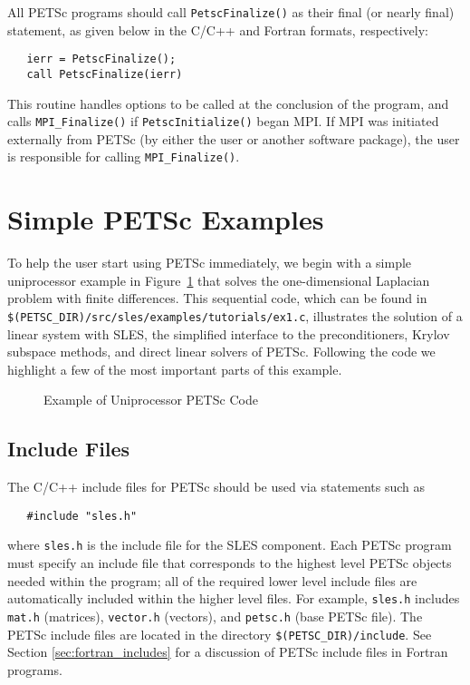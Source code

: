 {All PETSc programs should call {\tt PetscFinalize()} 
as their final (or nearly final) statement, as given below in the C/C++
and Fortran formats, respectively:
\begin{verbatim}
   ierr = PetscFinalize();
   call PetscFinalize(ierr)
\end{verbatim}
This routine handles options to be called at the conclusion of
the program, and calls {\tt MPI\_Finalize()} 
if {\tt PetscInitialize()}
began MPI. If MPI was initiated externally from PETSc (by either
the user or another software package), the user is
responsible for calling {\tt MPI\_Finalize()}. 

\section{Simple PETSc Examples}

\label{sec:simple}

To help the user start using PETSc immediately, we begin with a simple
uniprocessor example in Figure~\ref{fig:example1} that solves the
one-dimensional Laplacian problem with finite differences.  This
sequential code, which can be found in 
{\tt \$(PETSC\_DIR)/src/sles/examples/tutorials/ex1.c},
illustrates the solution of a linear system with SLES, the simplified
interface to the preconditioners, Krylov subspace methods, and direct
linear solvers of PETSc.  Following the code we highlight a few of the most important
parts of this example.  

\begin{figure}[H]
{\footnotesize
{}
}
\caption{Example of Uniprocessor PETSc Code}
\label{fig:example1}
\end{figure}

\subsection*{Include Files}

The C/C++ include files for PETSc should be used via statements such as
\begin{verbatim}
   #include "sles.h"
\end{verbatim}
where {\tt sles.h} is the include file for the SLES component.
Each PETSc program must specify an
include file that corresponds to the highest level PETSc objects
needed within the program; all of the required lower level include
files are automatically included within the higher level files.  For
example, {\tt sles.h} includes {\tt mat.h} (matrices),
{\tt vector.h} (vectors), and {\tt petsc.h} (base PETSc file).  
The PETSc include files are located in the directory 
{\tt \$(PETSC\_DIR)/include}.  See Section \ref{sec:fortran_includes}
for a discussion of PETSc include files in Fortran programs.

}
